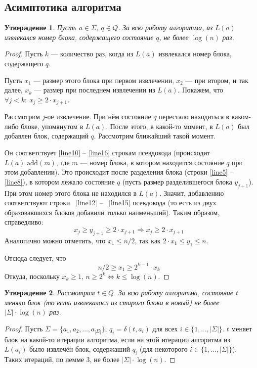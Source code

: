 \documentclass{article}
\newtheorem{statement}{Утверждение}
\begin{document}
\subsection{Асимптотика алгоритма}
\begin{statement}
  Пусть $a \in \Sigma$, $q \in Q$. За всю работу алгоритма, из $L(a)$ извлекался номер блока, содержащего состояние $q$, не более $\log(n)$ раз.   
\end{statement}
\begin{proof}
  Пусть $k$ --- количество раз, когда из $L(a)$ извлекался номер блока, содержащего $q$.

  Пусть $x_1$ --- размер этого блока при первом извлечении, $x_2$ --- при втором, и так далее, $x_k$ --- размер при последнем извлечении из $L(a)$. Покажем, что $\forall j < k: \ x_j \ge 2 \cdot x_{j+1}$.

  Рассмотрим $j$-ое извлечение. При нём состояние $q$ перестало находиться в каком-либо блоке, упомянутом в $L(a)$. После этого, в какой-то момент, в $L(a)$ был добавлен блок, содержащий $q$. Рассмотрим ближайший такой момент.

  Он соответствует \ref{line10} -- \ref{line16} строкам псевдокода (происходит $L(a).\text{add}(m)$, где $m$ --- номер блока, в котором находится состояние $q$ при этом добавлении). Это происходит после разделения блока (строки \ref{line5} -- \ref{line8}), в котором лежало состояние $q$ (пусть размер разделившегося блока $y_{j+1}$). При этом номер этого блока не находился в $L(a)$. Значит, добавлению соответствуют строки ~\ref{line12} -- ~\ref{line15} псевдокода (то есть из двух образовавшихся блоков добавили только наименьший). Таким образом, справедливо:
  \[x_j \ge y_{j+1} \ge 2 \cdot x_{j+1} \Rightarrow x_j \ge 2 \cdot x_{j+1}\]
  Аналогично можно отметить, что $x_1 \le n / 2$, так как $2 \cdot x_1 \le y_1 \le n$.

  Отсюда следует, что \[n/2 \ge x_1 \ge 2^{k-1} \cdot x_k\]
  Откуда, поскольку $x_k \ge 1$, $n \ge 2^k \Leftrightarrow k \le \log(n)$. 
\end{proof}
\begin{statement}
  Рассмотрим $t \in Q$. За всю работу алгоритма, состояние $t$ меняло блок (то есть извлекалось из старого блока в новый) не более $|\Sigma| \cdot \log(n)$ раз.
\end{statement}
\begin{proof}
  Пусть $\Sigma = \{a_1, a_2, \dots, a_{|\Sigma|}\}$; $q_i = \delta(t, a_i)$ для всех $i \in \{1, \dots, |\Sigma|\}$. $t$ меняет блок на какой-то итерации алгоритма, если на этой итерации алгоритма из $L(a_i)$ было извлечён блок, содержаший $q_i$ (для некоторого $i \in \{1, \dots, |\Sigma|\}$). Таких итераций, по лемме 3, не более $|\Sigma| \cdot \log(n)$.
\end{proof}
\end{document}
